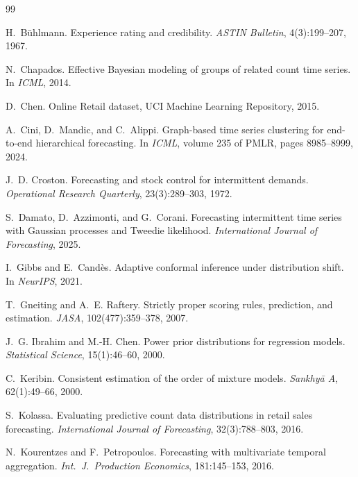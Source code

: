 \documentclass[twocolumn,10pt]{article}
\theoremstyle{definition}
\begin{document}
\begin{thebibliography}{99}

H.~B\"uhlmann.
\newblock Experience rating and credibility.
\newblock \emph{ASTIN Bulletin}, 4(3):199--207, 1967.

N.~Chapados.
\newblock Effective Bayesian modeling of groups of related count time series.
\newblock In \emph{ICML}, 2014.

D.~Chen.
\newblock Online Retail dataset, UCI Machine Learning Repository, 2015.

A.~Cini, D.~Mandic, and C.~Alippi.
\newblock Graph-based time series clustering for end-to-end hierarchical
  forecasting.
\newblock In \emph{ICML}, volume 235 of PMLR, pages 8985--8999, 2024.

J.~D. Croston.
\newblock Forecasting and stock control for intermittent demands.
\newblock \emph{Operational Research Quarterly}, 23(3):289--303, 1972.

S.~Damato, D.~Azzimonti, and G.~Corani.
\newblock Forecasting intermittent time series with Gaussian processes and
  Tweedie likelihood.
\newblock \emph{International Journal of Forecasting}, 2025.

I.~Gibbs and E.~Cand\`es.
\newblock Adaptive conformal inference under distribution shift.
\newblock In \emph{NeurIPS}, 2021.

T.~Gneiting and A.~E. Raftery.
\newblock Strictly proper scoring rules, prediction, and estimation.
\newblock \emph{JASA}, 102(477):359--378, 2007.

J.~G. Ibrahim and M.-H. Chen.
\newblock Power prior distributions for regression models.
\newblock \emph{Statistical Science}, 15(1):46--60, 2000.

C.~Keribin.
\newblock Consistent estimation of the order of mixture models.
\newblock \emph{Sankhy\=a A}, 62(1):49--66, 2000.

S.~Kolassa.
\newblock Evaluating predictive count data distributions in retail sales
  forecasting.
\newblock \emph{International Journal of Forecasting}, 32(3):788--803, 2016.

N.~Kourentzes and F.~Petropoulos.
\newblock Forecasting with multivariate temporal aggregation.
\newblock \emph{Int.\ J.\ Production Economics}, 181:145--153, 2016.


\end{thebibliography}
\end{document}
